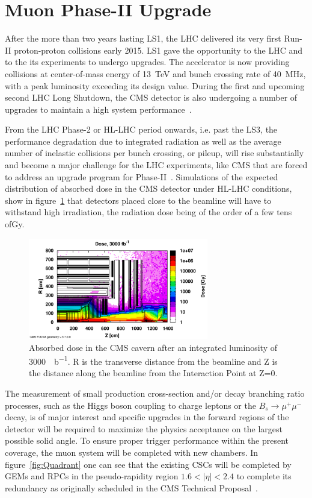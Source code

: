 \section{Muon Phase-II Upgrade}
\label{chapt2:sec:phase-2}

After the more than two years lasting \acf{LS1}, the \acf{LHC} delivered its very first Run-II proton-proton collisions early 2015. LS1 gave the opportunity to the LHC and to the its experiments to undergo upgrades. The accelerator is now providing collisions at center-of-mass energy of \SI{13}{TeV} and bunch crossing rate of \SI{40}{MHz}, with a peak luminosity exceeding its design value. During the first and upcoming second LHC Long Shutdown, the \acf{CMS} detector is also undergoing a number of upgrades to maintain a high system performance~\cite{MUONTDR}.

From the LHC Phase-2 or \acf{HL-LHC} period onwards, i.e. past the \acf{LS3}, the performance degradation due to integrated radiation as well as the average number of inelastic collisions per bunch crossing, or pileup, will rise substantially and become a major challenge for the LHC experiments, like CMS that are forced to address an upgrade program for Phase-II~\cite{PHASEIITP}. Simulations of the expected distribution of absorbed dose in the CMS detector under HL-LHC conditions, show in figure~\ref{fig:Dose} that detectors placed close to the beamline will have to withstand high irradiation, the radiation dose being of the order of a few tens of\si{Gy}.

\begin{figure}[H]
	\centering
	\includegraphics[width=0.7\textwidth]{fig/chapt2/HL-LHC-Dose.png}
	\caption{\label{fig:Dose} Absorbed dose in the CMS cavern after an integrated luminosity of \SI{3000}{\femto\per\barn}. R is the transverse distance from the beamline and Z is the distance along the beamline from the Interaction Point at Z=0.}
\end{figure}

The measurement of small production cross-section and/or decay branching ratio processes, such as the Higgs boson coupling to charge leptons or the $B_s \longrightarrow \mu^+\mu^-$ decay, is of major interest and specific upgrades in the forward regions of the detector will be required to maximize the physics acceptance on the largest possible solid angle. To ensure proper trigger performance within the present coverage, the muon system will be completed with new chambers. In figure~\ref{fig:Quadrant} one can see that the existing \acfp{CSC} will be completed by \acfp{GEM} and \acfp{RPC} in the pseudo-rapidity region $1.6<\vert\eta\vert<2.4$ to complete its redundancy as originally scheduled in the CMS Technical Proposal~\cite{CMSTP}.

